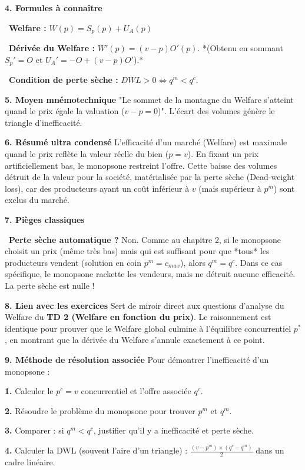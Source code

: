 \documentclass[11pt, a4paper]{report}
\begin{document}
\textbf{4. Formules à connaître}
\par \textbullet\ \textbf{Welfare :} $W(p) = S_p(p) + U_A(p)$
\par \textbullet\ \textbf{Dérivée du Welfare :} $W'(p) = (v-p)O'(p)$. *(Obtenu en sommant $S_p' = O$ et $U_A' = -O + (v-p)O'$).*
\par \textbullet\ \textbf{Condition de perte sèche :} $DWL > 0 \iff q^m < q^c$.

\textbf{5. Moyen mnémotechnique}
"Le sommet de la montagne du Welfare s'atteint quand le prix égale la valuation ($v-p = 0$)". L'écart des volumes génère le triangle d'inefficacité.

\textbf{6. Résumé ultra condensé}
L'efficacité d'un marché (Welfare) est maximale quand le prix reflète la valeur réelle du bien ($p=v$). En fixant un prix artificiellement bas, le monopsone restreint l'offre. Cette baisse des volumes détruit de la valeur pour la société, matérialisée par la perte sèche (Dead-weight loss), car des producteurs ayant un coût inférieur à $v$ (mais supérieur à $p^m$) sont exclus du marché.

\textbf{7. Pièges classiques}
\par \textbullet\ \textbf{Perte sèche automatique ?} Non. Comme au chapitre 2, si le monopsone choisit un prix (même très bas) mais qui est suffisant pour que *tous* les producteurs vendent (solution en coin $p^m = c_{max}$), alors $q^m = q^c$. Dans ce cas spécifique, le monopsone rackette les vendeurs, mais ne détruit aucune efficacité. La perte sèche est nulle !

\textbf{8. Lien avec les exercices}
Sert de miroir direct aux questions d'analyse du Welfare du \textbf{TD 2 (Welfare en fonction du prix)}. Le raisonnement est identique pour prouver que le Welfare global culmine à l'équilibre concurrentiel $p^*$, en montrant que la dérivée du Welfare s'annule exactement à ce point. 

\textbf{9. Méthode de résolution associée}
Pour démontrer l'inefficacité d'un monopsone :
\par \textbf{1.} Calculer le $p^c = v$ concurrentiel et l'offre associée $q^c$.
\par \textbf{2.} Résoudre le problème du monopsone pour trouver $p^m$ et $q^m$.
\par \textbf{3.} Comparer : si $q^m < q^c$, justifier qu'il y a inefficacité et perte sèche.
\par \textbf{4.} Calculer la DWL (souvent l'aire d'un triangle) : $\frac{(v - p^m) \times (q^c - q^m)}{2}$ dans un cadre linéaire.
\end{document}
